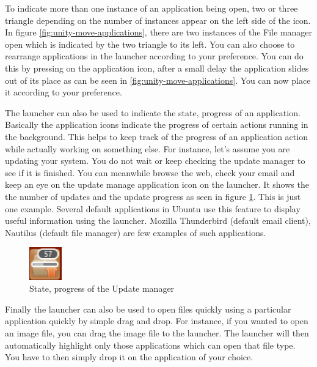 \par \noindent To indicate more than one instance of an application being open, two or three triangle depending on the number of instances appear on the left side of the icon. In figure \ref{fig:unity-move-applications}, there are two instances of the File manager open which is indicated by the two triangle to its left. You can also choose to rearrange applications in the launcher according to your preference. You can do this by pressing on the application icon, after a small delay the application slides out of its place as can be seen in \ref{fig:unity-move-applications}. You can now place it according to your preference. \\

\par \noindent The launcher can also be used to indicate the state, progress of an application. Basically the application icons indicate the progress of certain actions running in the background. This helps to keep track of the progress of an application action while actually working on something else. For instance, let's assume you are updating your system. You do not wait or keep checking the update manager to see if it is finished. You can meanwhile browse the web, check your email and keep an eye on the update manage application icon on the launcher. It shows the the number of updates and the update progress as seen in figure \ref{fig:update-number.png}. This is just one example. Several default applications in Ubuntu use this feature to display useful information using the launcher. Mozilla Thunderbird (default email client), Nautilus (default file manager) are few examples of such applications.\\

\begin{figure}[h]	
	\centering
	\includegraphics[width=40pt]{./images/desktop/update-number.png}
	\caption{State, progress of the Update manager}	
	\label{fig:update-number.png}		
\end{figure}

\par \noindent Finally the launcher can also be used to open files quickly using a particular application quickly by simple drag and drop. For instance, if you wanted to open an image file, you can drag the image file to the launcher. The launcher will then automatically highlight only those applications which can open that file type. You have to then simply drop it on the application of your choice.


